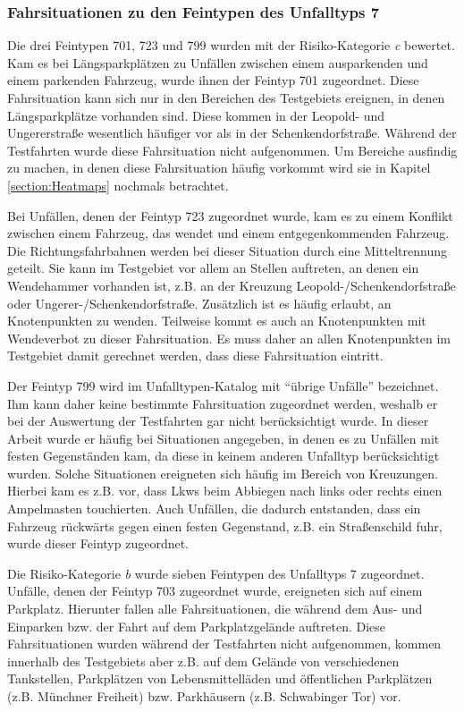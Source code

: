 \subsubsection{Fahrsituationen zu den Feintypen des Unfalltyps 7}
Die drei Feintypen 701, 723 und 799 wurden mit der Risiko-Kategorie \textit{c} bewertet. Kam es bei Längsparkplätzen zu Unfällen zwischen einem ausparkenden und einem parkenden Fahrzeug, wurde ihnen der Feintyp 701 zugeordnet. Diese Fahrsituation kann sich nur in den Bereichen des Testgebiets ereignen, in denen Längsparkplätze vorhanden sind. Diese kommen in der Leopold- und Ungererstraße wesentlich häufiger vor als in der Schenkendorfstraße. Während der Testfahrten wurde diese Fahrsituation nicht aufgenommen. Um Bereiche ausfindig zu machen, in denen diese Fahrsituation häufig vorkommt wird sie in Kapitel \ref{section:Heatmaps} nochmals betrachtet.

Bei Unfällen, denen der Feintyp 723 zugeordnet wurde, kam es zu einem Konflikt zwischen einem Fahrzeug, das wendet und einem entgegenkommenden Fahrzeug. Die Richtungsfahrbahnen werden bei dieser Situation durch eine Mitteltrennung geteilt. Sie kann im Testgebiet vor allem an Stellen auftreten, an denen ein Wendehammer vorhanden ist, z.B. an der Kreuzung Leopold-/Schenkendorfstraße oder Ungerer-/Schenkendorfstraße. Zusätzlich ist es häufig erlaubt, an Knotenpunkten zu wenden. Teilweise kommt es auch an Knotenpunkten mit Wendeverbot zu dieser Fahrsituation. Es muss daher an allen Knotenpunkten im Testgebiet damit gerechnet werden, dass diese Fahrsituation eintritt.

Der Feintyp 799 wird im Unfalltypen-Katalog mit \enquote{übrige Unfälle} bezeichnet. Ihm kann daher keine bestimmte Fahrsituation zugeordnet werden, weshalb er bei der Auswertung der Testfahrten gar nicht berücksichtigt wurde. In dieser Arbeit wurde er häufig bei Situationen angegeben, in denen es zu Unfällen mit festen Gegenständen kam, da diese in keinem anderen Unfalltyp berücksichtigt wurden. Solche Situationen ereigneten sich häufig im Bereich von Kreuzungen. Hierbei kam es z.B. vor, dass Lkws beim Abbiegen nach links oder rechts einen Ampelmasten touchierten. Auch Unfällen, die dadurch entstanden, dass ein Fahrzeug rückwärts gegen einen festen Gegenstand, z.B. ein Straßenschild fuhr, wurde dieser Feintyp zugeordnet.

Die Risiko-Kategorie \textit{b} wurde sieben Feintypen des Unfalltyps 7 zugeordnet. Unfälle, denen der Feintyp 703 zugeordnet wurde, ereigneten sich auf einem Parkplatz. Hierunter fallen alle Fahrsituationen, die während dem Aus- und Einparken bzw. der Fahrt auf dem Parkplatzgelände auftreten. Diese Fahrsituationen wurden während der Testfahrten nicht aufgenommen, kommen innerhalb des Testgebiets aber z.B. auf dem Gelände von verschiedenen Tankstellen, Parkplätzen von Lebensmittelläden und öffentlichen Parkplätzen (z.B. Münchner Freiheit) bzw. Parkhäusern (z.B. Schwabinger Tor) vor.

